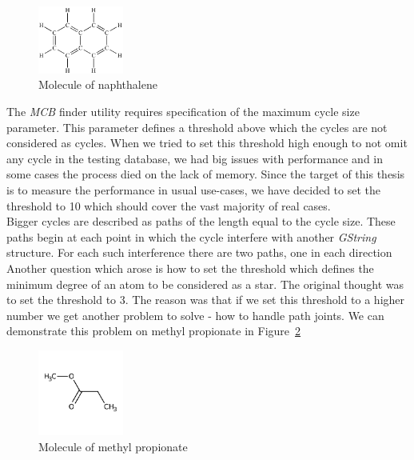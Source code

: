 {\begin{figure}[h]
	\centering
	\includegraphics[width=0.25\textwidth]{../img/naphthalene01.png}
	\caption{Molecule of naphthalene}
	\label{fig:naphthalene}
\end{figure}

The \textit{MCB} finder utility requires specification of the maximum cycle size parameter. This parameter defines a threshold above which the cycles are not considered as cycles. When we tried to set this threshold high enough to not omit any cycle in the testing database, we had big issues with performance and in some cases the process died on the lack of memory. Since the target of this thesis is to measure the performance in usual use-cases, we have decided to set the threshold to 10 which should cover the vast majority of real cases.\\

Bigger cycles are described as paths of the length equal to the cycle size. These paths begin at each point in which the cycle interfere with another \textit{GString} structure. For each such interference there are two paths, one in each direction\\

Another question which arose is how to set the threshold which defines the minimum degree of an atom to be considered as a star. The original thought was to set the threshold to 3. The reason was that if we set this threshold to a higher number we get another problem to solve - how to handle path joints. We can demonstrate this problem on methyl propionate in Figure~\ref{fig:methyl-propionate}\\

\begin{figure}[h]
	\centering
	\includegraphics[width=0.25\textwidth]{../img/methyl-propionate.jpg}
	\caption{Molecule of methyl propionate}
	\label{fig:methyl-propionate}
\end{figure}

}
